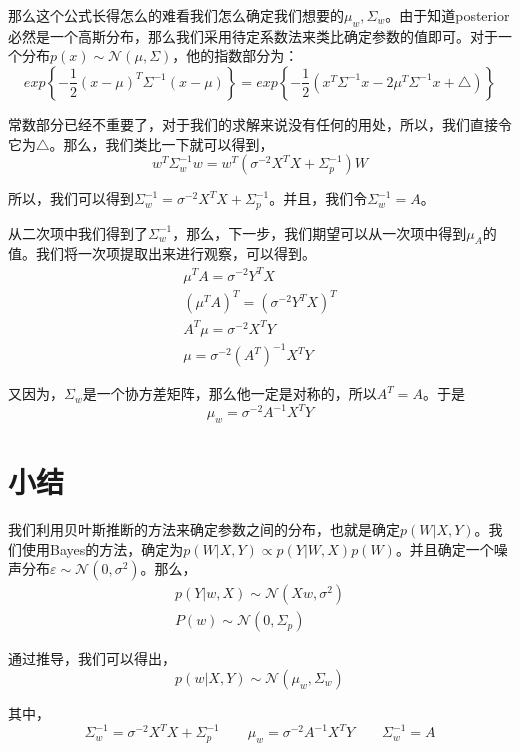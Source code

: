 \documentclass[a4paper]{article}
\begin{document}
那么这个公式长得怎么的难看我们怎么确定我们想要的$\mu_w,\Sigma_w$。由于知道posterior必然是一个高斯分布，那么我们采用待定系数法来类比确定参数的值即可。对于一个分布$p(x)\sim \mathcal{N}(\mu,\Sigma)$，他的指数部分为：
\begin{equation}
    exp\left\{ -\frac{1}{2}(x-\mu)^T\Sigma^{-1}(x-\mu) \right\} 
    = 
    exp\left\{ -\frac{1}{2}(x^T\Sigma^{-1}x - 2\mu^T\Sigma^{-1}x + \triangle) \right\}
\end{equation}

常数部分已经不重要了，对于我们的求解来说没有任何的用处，所以，我们直接令它为$\triangle$。那么，我们类比一下就可以得到，
\begin{equation}
    w^T\Sigma^{-1}_ww = w^T\left(\sigma^{-2}X^TX+ \Sigma_p^{-1}\right)W
\end{equation}

所以，我们可以得到$\Sigma_w^{-1}=\sigma^{-2}X^TX+\Sigma_p^{-1}$。并且，我们令$\Sigma_w^{-1}=A$。

从二次项中我们得到了$\Sigma_w^{-1}$，那么，下一步，我们期望可以从一次项中得到$\mu_A$的值。我们将一次项提取出来进行观察，可以得到。
\begin{gather}
    \mu^TA = \sigma^{-2}Y^TX \\
    (\mu^TA)^T = (\sigma^{-2}Y^TX)^T \\
    A^T\mu = \sigma^{-2}X^TY \\
    \mu = \sigma^{-2}(A^T)^{-1}X^TY 
\end{gather}

又因为，$\Sigma_w$是一个协方差矩阵，那么他一定是对称的，所以$A^T=A$。于是
\begin{equation}
    \mu_w = \sigma^{-2}A^{-1}X^TY
\end{equation}

\section{小结}
我们利用贝叶斯推断的方法来确定参数之间的分布，也就是确定$p(W|X,Y)$。我们使用Bayes的方法，确定为$p(W|X,Y)\propto p(Y|W,X)p(W)$。并且确定一个噪声分布$\varepsilon\sim\mathcal{N}(0,\sigma^2)$。那么，
\begin{gather}
    p(Y|w,X) \sim \mathcal{N}(Xw,\sigma^2) \\
    P(w) \sim \mathcal{N}(0,\Sigma_p)
\end{gather}

通过推导，我们可以得出，
\begin{equation}
    p(w|X,Y) \sim \mathcal{N}(\mu_w, \Sigma_w)
\end{equation}

其中，
\begin{equation}
    \Sigma_w^{-1}=\sigma^{-2}X^TX+\Sigma_p^{-1} \qquad \mu_w = \sigma^{-2}A^{-1}X^TY \qquad \Sigma_w^{-1}=A
\end{equation}
\end{document}
